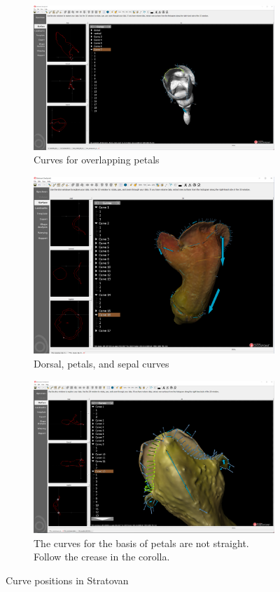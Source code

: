 \documentclass[10pt,letter,english]{article}
\begin{document}
\begin{figure}[H]
\centering
\begin{subfigure}[t]{1\textwidth}
  \centering
  \includegraphics[width=.6\textwidth]{Figures/stratovan_curves_petals.png}
  \caption{Curves for overlapping petals}
  \label{}
\end{subfigure}

\begin{subfigure}[t]{1\textwidth}
  \centering
  \includegraphics[width=.6\textwidth]{Figures/stratovan_landmarks_curves_basepetals_2.png}
  \caption{Dorsal, petals, and sepal curves}
  \label{}
\end{subfigure}

\begin{subfigure}[t]{1\textwidth}
  \centering
  \includegraphics[width=.6\textwidth]{Figures/stratovan.png}
  \caption{The curves for the basis of petals are not straight. Follow the crease in the corolla.}
  \label{}
\end{subfigure}

\caption{Curve positions in Stratovan}
\label{}
\end{figure}
\end{document}
